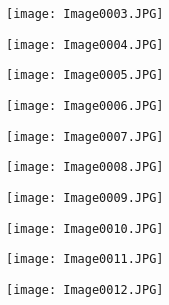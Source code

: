 \documentclass{article}
\theoremstyle{definition}
\theoremstyle{remark}
\begin{document}
\begin{center}
    \texttt{[image: Image0003.JPG]}
\end{center}
\begin{center}
    \texttt{[image: Image0004.JPG]}
\end{center}
\begin{center}
    \texttt{[image: Image0005.JPG]}
\end{center}
\begin{center}
    \texttt{[image: Image0006.JPG]}
\end{center}
\begin{center}
    \texttt{[image: Image0007.JPG]}
\end{center}
\begin{center}
    \texttt{[image: Image0008.JPG]}
\end{center}
\begin{center}
    \texttt{[image: Image0009.JPG]}
\end{center}
\begin{center}
    \texttt{[image: Image0010.JPG]}
\end{center}
\begin{center}
    \texttt{[image: Image0011.JPG]}
\end{center}
\begin{center}
    \texttt{[image: Image0012.JPG]}
\end{center}
\end{document}
